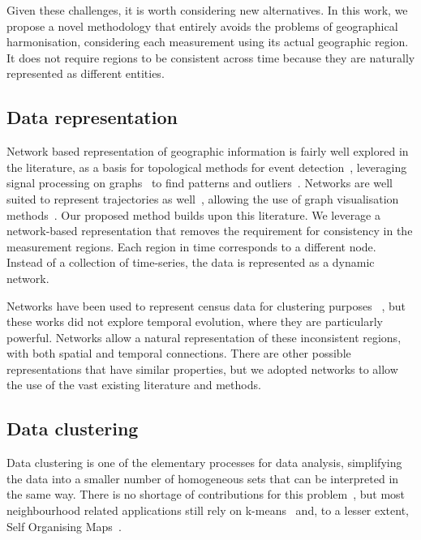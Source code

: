 Given these challenges, it is worth considering new alternatives. In this work,
we propose a novel methodology that entirely avoids the problems of geographical
harmonisation, considering each measurement using its actual geographic region.
It does not require regions to be consistent across time because they are
naturally represented as different entities. 

\subsection{Data representation}

Network based representation of geographic information is fairly well explored
in the literature, as a basis for topological methods for event
detection~\citep{Doraiswamy2014}, leveraging signal processing on
graphs~\citep{shuman2013emerging,sandryhaila2013discrete} to find patterns and
outliers~\citep{Valdivia2015,Dias2015,Alce2018}. Networks are well suited to
represent trajectories as
well~\citep{VonLandesberger2016,Huang2016,chen2015survey}, allowing the use of
graph visualisation methods~\citep{Vehlow2015,Beck2014}. Our proposed method
builds upon this literature. We leverage a network-based representation that
removes the requirement for consistency in the measurement regions. Each region
in time corresponds to a different node. Instead of a collection of time-series,
the data is represented as a dynamic network. 

Networks have been used to represent census data for clustering purposes
~\citep{Dias2015,Setiadi2017}, but these works did not explore temporal
evolution, where they are particularly powerful. Networks allow a natural
representation of these inconsistent regions, with both spatial and temporal
connections. There are other possible representations that have similar
properties, but we adopted networks to allow the use of the vast existing
literature and methods.


\subsection{Data clustering}

Data clustering is one of the elementary processes for data analysis,
simplifying the data into a smaller number of homogeneous sets that can be
interpreted in the same way. There is no shortage of contributions for this
problem~\citep{Fahad2014}, but most neighbourhood related applications still
rely on k-means~\citep{jain2010data,Delmelle2016} and, to a lesser extent, Self
Organising Maps~\citep{Delmelle2017,Ling2016}.

